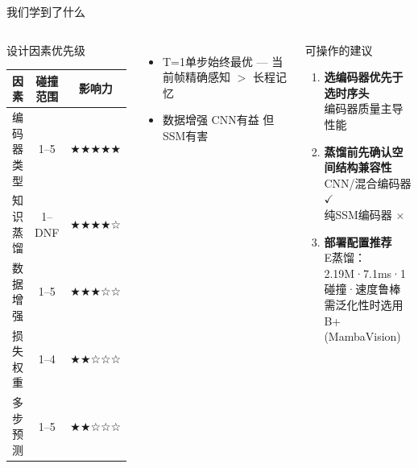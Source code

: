 \documentclass[aspectratio=169,10pt]{beamer}
\newcommand{\pos}[1]{\textcolor{positive}{#1}}
\newcommand{\con}[1]{\textcolor{negative}{#1}}
\newcommand{\HL}[1]{\textcolor{emphasis}{#1}}
\begin{document}
\begin{frame}{我们学到了什么}
\begin{columns}[T]
\begin{block}{设计因素优先级}
\centering\footnotesize
\begin{tabular}{lcc}
\toprule
因素 & 碰撞范围 & 影响力 \\
\midrule
\HL{编码器类型} & 1--5 & \HL{★★★★★} \\
知识蒸馏 & 1--DNF & ★★★★☆ \\
数据增强 & 1--5 & ★★★☆☆ \\
损失权重 & 1--4 & ★★☆☆☆ \\
多步预测 & 1--5 & ★★☆☆☆ \\
\bottomrule
\end{tabular}
\end{block}
\vspace{0.2cm}
\begin{itemize}\footnotesize
\item T=1单步始终最优 — 当前帧精确感知 $>$ 长程记忆
\item 数据增强 \pos{CNN有益} 但 \con{SSM有害}
\end{itemize}

\begin{block}{可操作的建议}
\begin{enumerate}\footnotesize
\item \textbf{选编码器优先于选时序头}\\
编码器质量主导性能
\item \textbf{蒸馏前先确认空间结构兼容性}\\
CNN/混合编码器 $\checkmark$\\
纯SSM编码器 $\times$
\item \textbf{部署配置推荐}\\
E蒸馏：2.19M·7.1ms·1碰撞·速度鲁棒\\
需泛化性时选用B+ (MambaVision)
\end{enumerate}
\end{block}
\end{columns}
\end{frame}
\end{document}
